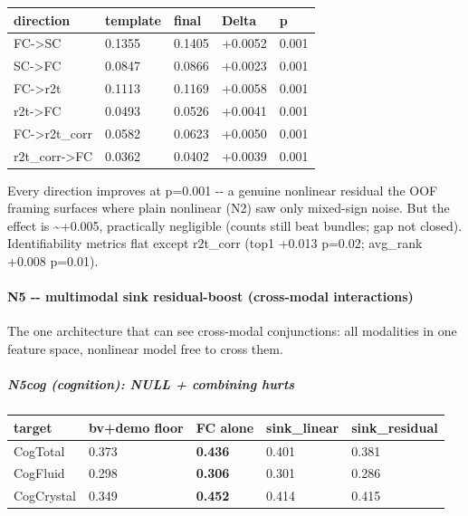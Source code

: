 {\def\LTcaptype{none} %
\begin{longtable}[]{@{}lllll@{}}
\toprule\noalign{}
direction & template & final & Delta & p \\
\midrule\noalign{}
\endhead
\bottomrule\noalign{}
\endlastfoot
FC-\textgreater SC & 0.1355 & 0.1405 & +0.0052 & 0.001 \\
SC-\textgreater FC & 0.0847 & 0.0866 & +0.0023 & 0.001 \\
FC-\textgreater r2t & 0.1113 & 0.1169 & +0.0058 & 0.001 \\
r2t-\textgreater FC & 0.0493 & 0.0526 & +0.0041 & 0.001 \\
FC-\textgreater r2t\_corr & 0.0582 & 0.0623 & +0.0050 & 0.001 \\
r2t\_corr-\textgreater FC & 0.0362 & 0.0402 & +0.0039 & 0.001 \\
\end{longtable}
}

Every direction improves at p=0.001 -\/- a genuine nonlinear residual the OOF framing surfaces where plain nonlinear (N2) saw only mixed-sign noise. But the effect is \textasciitilde+0.005, practically negligible (counts still beat bundles; gap not closed). Identifiability metrics flat except r2t\_corr (top1 +0.013 p=0.02; avg\_rank +0.008 p=0.01).

\paragraph{N5 -\/- multimodal sink residual-boost (cross-modal interactions)}\label{n5----multimodal-sink-residual-boost-cross-modal-interactions}

The one architecture that can see cross-modal conjunctions: all modalities in one feature space, nonlinear model free to cross them.

\subparagraph{N5cog (cognition): NULL + combining hurts}\label{n5cog-cognition-null--combining-hurts}

{\def\LTcaptype{none} %
\begin{longtable}[]{@{}lllll@{}}
\toprule\noalign{}
target & bv+demo floor & FC alone & sink\_linear & sink\_residual \\
\midrule\noalign{}
\endhead
\bottomrule\noalign{}
\endlastfoot
CogTotal & 0.373 & \textbf{0.436} & 0.401 & 0.381 \\
CogFluid & 0.298 & \textbf{0.306} & 0.301 & 0.286 \\
CogCrystal & 0.349 & \textbf{0.452} & 0.414 & 0.415 \\
\end{longtable}
}

